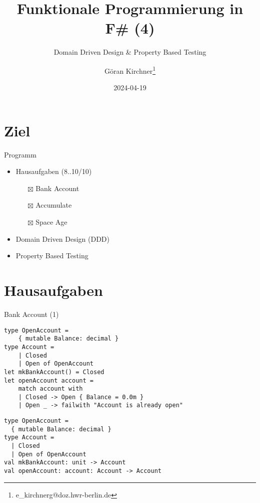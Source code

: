 \documentclass[t]{beamer}
\author{Göran Kirchner\thanks{e\_kirchnerg@doz.hwr-berlin.de}}
\date{2024-04-19}
\title{Funktionale Programmierung in F\# (4)}
\subtitle{Domain Driven Design \& Property Based Testing}
\begin{document}
\maketitle

\section{Ziel }
\label{sec:org3f94811}
\begin{frame}[label={sec:orgfd5082a}]{Programm}
\begin{itemize}
\item Hausaufgaben (8..10/10)
\begin{itemize}
\item[{$\boxtimes$}] Bank Account
\item[{$\boxtimes$}] Accumulate
\item[{$\boxtimes$}] Space Age
\end{itemize}
\item Domain Driven Design (DDD)
\item Property Based Testing
\end{itemize}
\end{frame}

\section{Hausaufgaben }
\label{sec:org8aefc7e}

\begin{frame}[label={sec:org711a77a},fragile]{Bank Account (1)}
 \begin{verbatim}
type OpenAccount =
    { mutable Balance: decimal }
type Account =
    | Closed
    | Open of OpenAccount
let mkBankAccount() = Closed
let openAccount account =
    match account with
    | Closed -> Open { Balance = 0.0m }
    | Open _ -> failwith "Account is already open"
\end{verbatim}

\begin{verbatim}
type OpenAccount =
  { mutable Balance: decimal }
type Account =
  | Closed
  | Open of OpenAccount
val mkBankAccount: unit -> Account
val openAccount: account: Account -> Account
\end{verbatim}
\end{frame}
\end{document}
